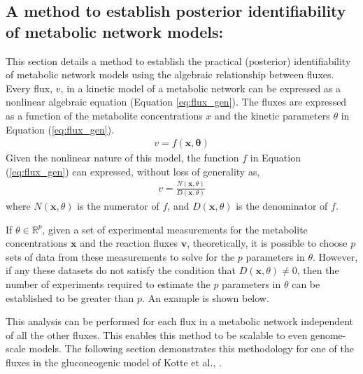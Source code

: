 \documentclass[10pt]{article}
\begin{document}
	\subsection{A method to establish posterior identifiability of metabolic network models:}
	This section details a method to establish the practical (posterior) identifiability of metabolic network models using the algebraic relationship between fluxes.
	Every flux, $v$, in a kinetic model of a metabolic network can be expressed as a nonlinear algebraic equation (Equation \ref{eq:flux_gen}). The fluxes are expressed as a function of the metabolite concentrations $x$ and the kinetic parameters $\theta$ in Equation (\ref{eq:flux_gen}).
	\begin{align}\label{eq:flux_gen}
		v = f(\mathbf{x},\mathbf{\theta})
	\end{align}
	Given the nonlinear nature of this model, the function $f$ in Equation (\ref{eq:flux_gen}) can expressed, without loss of generality as,
	\begin{align}\label{eq:nr_dr}
		v = \frac{N(\mathbf{x},\theta)}{D(\mathbf{x},\theta)}
	\end{align}
	where $N(\mathbf{x},\theta)$ is the numerator of $f$, and $D(\mathbf{x},\theta)$ is the denominator of $f$.
	
	If $\theta \in \mathbb{R}^p$, given a set of experimental measurements for the metabolite concentrations $\mathbf{x}$ and the reaction fluxes $\mathbf{v}$, theoretically, it is possible to choose $p$ sets of data from these measurements to solve for the $p$ parameters in $\theta$. However, if any these datasets do not satisfy the condition that $D(\mathbf{x},\theta) \neq 0$, then the number of experiments required to estimate the $p$ parameters in $\theta$ can be established to be greater than $p$. An example is shown below.
	
	This analysis can be performed for each flux in a metabolic network independent of all the other fluxes. This enables this method to be scalable to even genome-scale models. The following section demonstrates this methodology for one of the fluxes in the gluconeogenic model of Kotte et al., \parencite{Kotte2014}.
		
\end{document}
